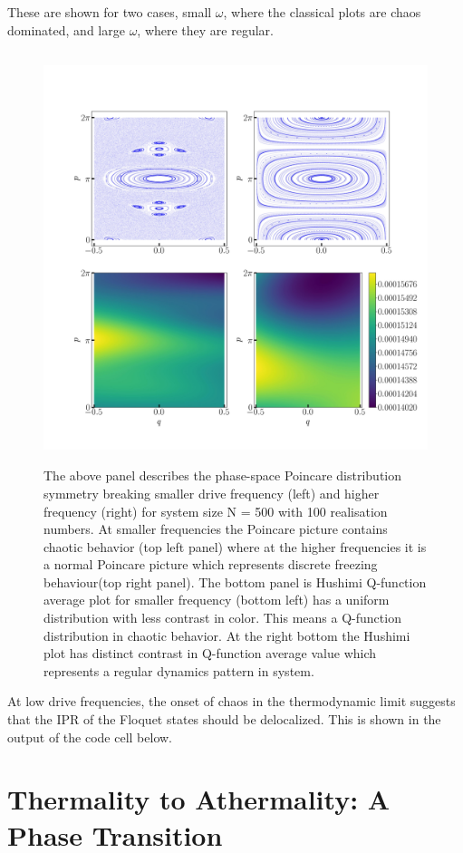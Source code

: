 \documentclass{article}
\begin{document}
These are shown for two cases, small $\omega$, where the classical plots are chaos dominated, and large $\omega$, where they are regular.
\begin{figure}[ht!]
\centering
\includegraphics[height = 12.0cm, width = 12cm]{lmg_poincare.jpeg}
\caption{\color{blue}The above panel describes the phase-space Poincare distribution symmetry breaking smaller drive frequency (left) and higher frequency (right) for system size N = 500 with 100 realisation numbers. At smaller frequencies the Poincare picture contains chaotic behavior (top left panel) where at the higher frequencies it is a normal Poincare picture which represents discrete freezing behaviour(top right panel). The bottom panel is Hushimi Q-function average plot for  smaller frequency (bottom left) has a uniform distribution with less contrast in color. This means a Q-function distribution in chaotic behavior. At the right bottom the Hushimi plot has distinct contrast in Q-function average value which represents a regular dynamics pattern in system.}
\end{figure}

At low drive frequencies, the onset of chaos in the thermodynamic limit suggests that the IPR of the Floquet states should be delocalized. This is shown in the output of the code cell below.

\section{Thermality to Athermality: A Phase Transition}
\end{document}
